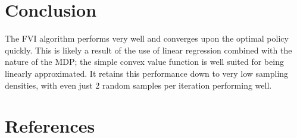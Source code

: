 \documentclass[a4paper, 12pt]{article}
\begin{document}
\section*{Conclusion}
The FVI algorithm performs very well and converges upon the optimal policy
quickly. This is likely a result of the use of linear regression combined with
the nature of the MDP; the simple convex value function is well suited for being
linearly approximated. It retains this performance down to very low sampling
densities, with even just 2 random samples per iteration performing well.

\section*{References}


\end{document}
